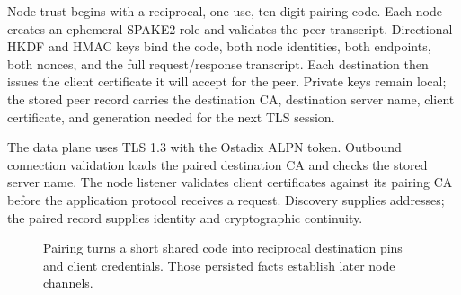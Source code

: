 \documentclass[11pt,oneside]{article}
\begin{document}
Node trust begins with a reciprocal, one-use, ten-digit pairing code. Each node
creates an ephemeral SPAKE2 role and validates the peer transcript. Directional
HKDF and HMAC keys bind the code, both node identities, both endpoints, both
nonces, and the full request/response transcript. Each destination then issues
the client certificate it will accept for the peer. Private keys remain local;
the stored peer record carries the destination CA, destination server name,
client certificate, and generation needed for the next TLS session.

The data plane uses TLS 1.3 with the Ostadix ALPN token. Outbound connection
validation loads the paired destination CA and checks the stored server name.
The node listener validates client certificates against its pairing CA before
the application protocol receives a request. Discovery supplies addresses;
the paired record supplies identity and cryptographic continuity.

\begin{figure}[htbp]
\centering
{}
\caption{Pairing turns a short shared code into reciprocal destination pins and
client credentials. Those persisted facts establish later node channels.}
\label{fig:pairing}
\end{figure}
\end{document}
